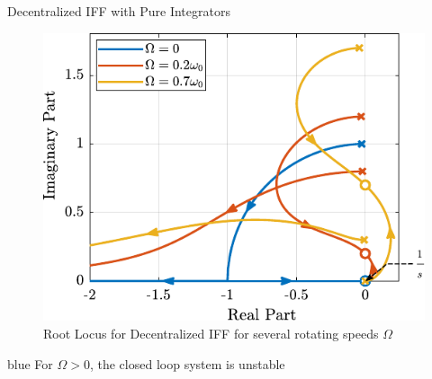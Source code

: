 \documentclass[t, minted]{clean-beamer}
\begin{document}
\begin{frame}[label={sec:orgb8d521c}]{Decentralized IFF with Pure Integrators}
\begin{figure}[htbp]
\centering
\includegraphics[width=0.7\linewidth]{figs/root_locus_pure_iff.pdf}
\caption{Root Locus for Decentralized IFF for several rotating speeds \(\Omega\)}
\end{figure}

\vspace{-1em}

\begin{cbox}[]{blue}{}
\centering For \(\Omega > 0\), the closed loop system is unstable
\end{cbox}
\end{frame}
\end{document}
